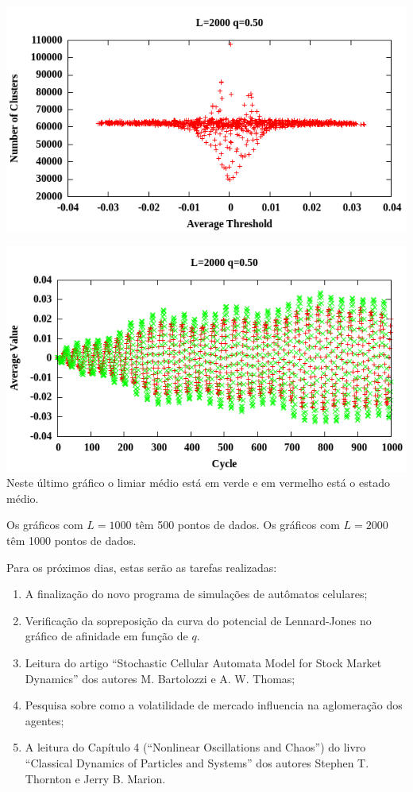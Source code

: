 \documentclass[12pt,a4paper,final]{article}
\begin{document}
\includegraphics[width=\linewidth]{dataL2000Q50ClustersVsAvgThres.png}

\includegraphics[width=\linewidth]{dataL2000Q50AvgStateThresVScycle.png}\\
Neste último gráfico o limiar médio está em verde e em vermelho está o estado médio.

Os gráficos com $L=1000$ têm 500 pontos de dados.
Os gráficos com $L=2000$ têm 1000 pontos de dados.

  Para os próximos dias, estas serão as tarefas realizadas:
	\begin{enumerate}
		\item A finalização do novo programa de simulações de autômatos celulares;
		\item Verificação da sopreposição da curva do potencial de Lennard-Jones no gráfico de afinidade em função de $q$.
		\item Leitura do artigo ``Stochastic Cellular Automata Model for Stock Market Dynamics'' dos autores M. Bartolozzi e A. W. Thomas;
		\item Pesquisa sobre como a volatilidade de mercado influencia na aglomeração dos agentes;
		\item A leitura do Capítulo 4 (``Nonlinear Oscillations and Chaos'') do livro ``Classical Dynamics of Particles and Systems'' dos autores Stephen T. Thornton e Jerry B. Marion.
	\end{enumerate}
\end{document}
